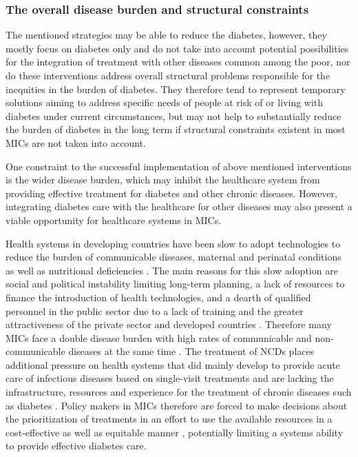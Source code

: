 \subsubsection{The overall disease burden and structural constraints}

The mentioned strategies may be able to reduce the diabetes, however, they mostly focus on diabetes only and do not take into account potential possibilities for the integration of treatment with other diseases common among the poor, nor do these interventions address overall structural problems responsible for the inequities in the burden of diabetes. They therefore tend to represent temporary solutions aiming to address specific needs of people at risk of or living with diabetes under current circumstances, but may not help to substantially reduce the burden of diabetes in the long term if structural constraints existent in most \acp{MIC} are not taken into account. 

One constraint to the successful implementation of above mentioned interventions is the wider disease burden, which may inhibit the healthcare system  from providing effective treatment for diabetes and other chronic diseases. However, integrating diabetes care with the healthcare for other diseases may also present a viable opportunity for healthcare systems in \acp{MIC}.

Health systems in developing countries have been slow to adopt technologies to reduce the burden of communicable diseases, maternal and perinatal conditions as well as nutritional deficiencies \parencite{Gutierrez-delgado2009}. The main reasons for this slow adoption are social and political instability limiting long-term planning, a lack of resources to finance the introduction of health technologies, and a dearth of qualified personnel in the public sector due to a lack of training and the greater attractiveness of the private sector and developed countries \parencite{Gutierrez-delgado2009}. Therefore many \acp{MIC} face a double disease burden with high rates of communicable and non-communicable diseases at the same time \parencite{Gutierrez-delgado2009}. The treatment of \acp{NCD} places additional pressure on health systems that did mainly develop to provide acute care of infectious diseases based on single-visit treatments and are lacking the infrastructure, resources and experience for the treatment of chronic diseases such as diabetes \parencite{Nulu2016}. Policy makers in \acp{MIC} therefore are forced to make decisions about the prioritization of treatments in an effort to use the available resources in a cost-effective as well as equitable manner \parencite{Gutierrez-delgado2009}, potentially limiting a systems ability to provide effective diabetes care.

